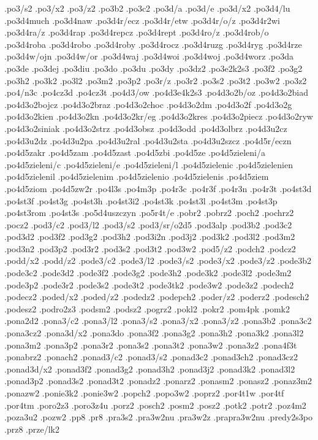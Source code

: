 {.po3/s2
.po3/x2
.po3/z2
.po3b2
.po3c2
.po3d/a
.po3d/e
.po3d/x2
.po3d4/lu
.po3d4much
.po3d4naw
.po3d4r/ecz
.po3d4r/etw
.po3d4r/o/z
.po3d4r2wi
.po3d4ra/z
.po3d4rap
.po3d4repcz
.po3d4rept
.po3d4ro/z
.po3d4rob/o
.po3d4roba
.po3d4robo
.po3d4roby
.po3d4rocz
.po3d4ruzg
.po3d4ryg
.po3d4rze
.po3d4w/ojn
.po3d4w/or
.po3d4waj
.po3d4woi
.po3d4woj
.po3d4worz
.po3da
.po3de
.po3dej
.po3diu
.po3do
.po3du
.po3dy
.po3dz2
.po3e2k2s3
.po3f2
.po3g2
.po3h2
.po3k2
.po3l2
.po3m2
.po3p2
.po3r/z
.po3r2
.po3s2
.po3t2
.po3w2
.po3z2
.po4/n3c
.po4cz3d
.po4cz3t
.po4d3/ow
.po4d3e4k2s3
.po4d3o2b/oz
.po4d3o2biad
.po4d3o2bojcz
.po4d3o2braz
.po4d3o2choc
.po4d3o2dm
.po4d3o2f
.po4d3o2g
.po4d3o2kien
.po4d3o2kn
.po4d3o2kr/eg
.po4d3o2kres
.po4d3o2piecz
.po4d3o2ryw
.po4d3o2siniak
.po4d3o2strz
.po4d3obsz
.po4d3odd
.po4d3olbrz
.po4d3u2cz
.po4d3u2dz
.po4d3u2pa
.po4d3u2ral
.po4d3u2sta
.po4d3u2szcz
.po4d5r/eczn
.po4d5zakr
.po4d5zam
.po4d5zast
.po4d5zbi
.po4d5ze
.po4d5zieleni/a
.po4d5zieleni/c
.po4d5zieleni/e
.po4d5zieleni/l
.po4d5zielenic
.po4d5zielenien
.po4d5zielenil
.po4d5zielenim
.po4d5zielenio
.po4d5zielenis
.po4d5ziem
.po4d5ziom
.po4d5zw2r
.po4l3s
.po4m3p
.po4r3c
.po4r3f
.po4r3n
.po4r3t
.po4st3d
.po4st3f
.po4st3g
.po4st3h
.po4st3i2
.po4st3k
.po4st3l
.po4st3m
.po4st3p
.po4st3rom
.po4st3s
.po5d4uszczyn
.po5r4t/e
.pobr2
.pobrz2
.poch2
.pochrz2
.pocz2
.pod3/c2
.pod3/l2
.pod3/s2
.pod3/sr/o2d5
.pod3alp
.pod3b2
.pod3c2
.pod3d2
.pod3f2
.pod3g2
.pod3h2
.pod3i2n
.pod3j2
.pod3k2
.pod3l2
.pod3m2
.pod3n2
.pod3p2
.pod3r2
.pod3s2
.pod3t2
.pod3w2
.pod5/z2
.podch2
.podcz2
.podd/x2
.podd/z2
.pode3/c2
.pode3/l2
.pode3/s2
.pode3/x2
.pode3/z2
.pode3b2
.pode3c2
.pode3d2
.pode3f2
.pode3g2
.pode3h2
.pode3k2
.pode3l2
.pode3m2
.pode3p2
.pode3r2
.pode3s2
.pode3t2
.pode3tk2
.pode3w2
.pode3z2
.podech2
.podecz2
.poded/x2
.poded/z2
.podedz2
.podepch2
.poder/z2
.poderz2
.podesch2
.podesz2
.podro2z3
.podsm2
.podsz2
.pogrz2
.pokl2
.pokr2
.pom4pk
.pomk2
.pona2d2
.pona3/c2
.pona3/l2
.pona3/s2
.pona3/x2
.pona3/z2
.pona3b2
.pona3c2
.pona3cz2
.pona3d/x2
.pona3do
.pona3f2
.pona3g2
.pona3h2
.pona3k2
.pona3l2
.pona3m2
.pona3p2
.pona3r2
.pona3s2
.pona3t2
.pona3w2
.pona3z2
.pona4f3t
.ponabrz2
.ponach2
.ponad3/c2
.ponad3/s2
.ponad3c2
.ponad3ch2
.ponad3cz2
.ponad3d/x2
.ponad3f2
.ponad3g2
.ponad3h2
.ponad3j2
.ponad3k2
.ponad3l2
.ponad3p2
.ponad3s2
.ponad3t2
.ponadz2
.ponarz2
.ponasm2
.ponasz2
.ponaz3m2
.ponazw2
.ponie3k2
.ponie3w2
.popch2
.popo3w2
.poprz2
.por4t1w
.por4tf
.por4tm
.poro2z3
.poro3z4u
.porz2
.posch2
.posm2
.posz2
.potk2
.potr2
.poz4m2
.poza3u2
.pozw2
.pp8
.pr8
.pra3s2
.pra3w2nu
.pra3w2z
.prapra3w2nu
.predy2s3po
.prz8
.prze/lk2
}
